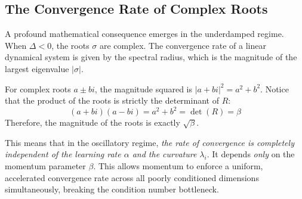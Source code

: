 \subsection{The Convergence Rate of Complex Roots}
A profound mathematical consequence emerges in the underdamped regime. When $\Delta < 0$, the roots $\sigma$ are complex. The convergence rate of a linear dynamical system is given by the spectral radius, which is the magnitude of the largest eigenvalue $|\sigma|$.

For complex roots $a \pm bi$, the magnitude squared is $|a + bi|^2 = a^2 + b^2$. Notice that the product of the roots is strictly the determinant of $R$:
\begin{equation}
    (a + bi)(a - bi) = a^2 + b^2 = \det(R) = \beta
\end{equation}
Therefore, the magnitude of the roots is exactly $\sqrt{\beta}$. 

This means that in the oscillatory regime, \textit{the rate of convergence is completely independent of the learning rate $\alpha$ and the curvature $\lambda_i$}. It depends \textit{only} on the momentum parameter $\beta$. This allows momentum to enforce a uniform, accelerated convergence rate across all poorly conditioned dimensions simultaneously, breaking the condition number bottleneck.

